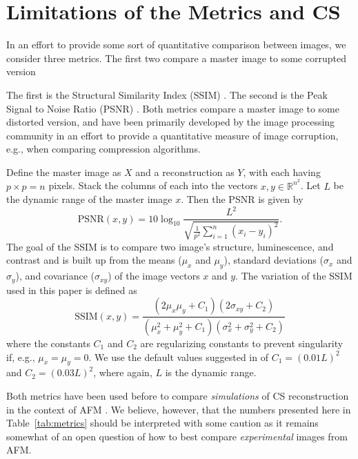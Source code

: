 \documentclass[11pt]{article}
\begin{document}
\section{Limitations of the Metrics and CS}
In an effort to provide some sort of quantitative comparison between images, we consider three metrics. The first two compare a master image to some corrupted version

The first is the Structural Similarity Index (SSIM) \cite{wang_image_2004}. The second is the Peak Signal to Noise Ratio (PSNR) \cite{Luo_nano_2015}. Both metrics compare a master image to some distorted version, and have been primarily developed by the image processing community in an effort to provide a quantitative measure of image corruption, e.g., when comparing compression algorithms.

Define the master image as $X$ and a reconstruction as $Y$, with each having $p\times p=n$ pixels. Stack the columns of each into the vectors $x, y\in\mathbb{R}^{n^2}$. Let $L$ be the dynamic range of the master image $x$. Then the PSNR is given by
\begin{equation*}
  \text{PSNR}(x,y) = 10\log_{10}\frac{L^2}
  {\sqrt{\frac{1}{p^2} \sum_{i=1}^{n}( x_{i} - y_{i})^2}}.
\end{equation*}
The goal of the SSIM is to compare two image's structure, luminescence, and contrast and is built up from the means ($\mu_x$ and $\mu_y$), standard deviations ($\sigma_x$ and $\sigma_y$), and covariance ($\sigma_{xy}$) of the image vectors $x$ and $y$.  
The variation of the SSIM used in this paper is defined as
\begin{equation*}
  \text{SSIM}(x,y) = \frac{(2\mu_x\mu_y + C_1)(2\sigma_{xy}+C_2)}
  {(\mu_x^2 + \mu_y^2 + C_1)(\sigma_x^2 + \sigma_y^2 + C_2)}
\end{equation*}
where the constants $C_1$ and $C_2$ are regularizing constants to prevent singularity if, e.g., $\mu_x=\mu_y=0$. We use the default values suggested in \cite{wang_image_2004} of $C_1=(0.01L)^2$ and ${C_2=(0.03L)^2}$, where again, $L$ is the dynamic range.

Both metrics have been used before to compare \emph{simulations} of CS reconstruction in the context of AFM \cite{oxvig_structure_2017, Luo_nano_2015}. We believe, however, that the numbers presented here in Table~\ref{tab:metrics} should be interpreted with some caution as it remains somewhat of an open question of how to best compare \emph{experimental} images from AFM.
\end{document}
